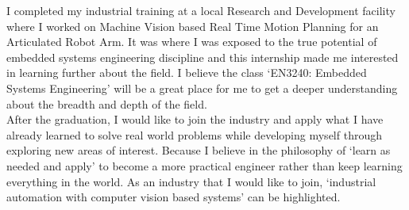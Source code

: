 \documentclass[11pt,letterpaper]{article}
\begin{document}
I completed my industrial training at a local Research and Development facility where I worked on Machine Vision based Real Time Motion Planning for an Articulated Robot Arm. It was where I was exposed to the true potential of embedded systems engineering discipline and this internship made me interested in learning further about the field. I believe the class `EN3240: Embedded Systems Engineering' will be a great place for me to get a deeper understanding about the breadth and depth of the field.\\


After the graduation, I would like to join the industry and apply what I have already learned to solve real world problems while developing myself through exploring new areas of interest. Because I believe in the philosophy of `learn as needed and apply' to become a more practical engineer rather than keep learning everything in the world. As an industry that I would like to join, `industrial automation with computer vision based systems' can be highlighted.
\end{document}
